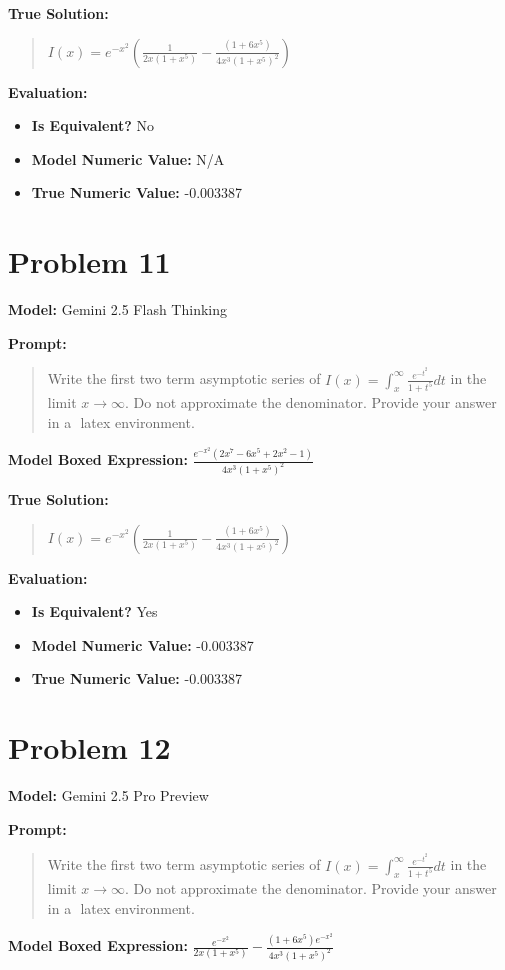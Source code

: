 \documentclass{article}
\begin{document}
\textbf{True Solution:}
\begin{quote}
$I(x) = e^{-x^2}(\frac{1}{2x(1+x^5)} - \frac{(1+6x^5)}{4x^3(1+x^5)^2})$
\end{quote}

\textbf{Evaluation:}
\begin{itemize}
\item \textbf{Is Equivalent?} No
\item \textbf{Model Numeric Value:} N/A
\item \textbf{True Numeric Value:} -0.003387
\end{itemize}
\vspace{1cm}
\section*{Problem 11}
\textbf{Model:} Gemini 2.5 Flash Thinking

\textbf{Prompt:}
\begin{quote}
Write the first two term asymptotic series of $I(x) = \int^\infty_x \frac{e^{-t^2}}{1+t^5} dt$ in the limit $x \rightarrow \infty$. Do not approximate the denominator. Provide your answer in a $\boxed{}$ latex environment.
\end{quote}
\textbf{Model Boxed Expression:} $\frac{e^{-x^2} (2x^7-6x^5+2x^2-1)}{4x^3(1+x^5)^2}$

\textbf{True Solution:}
\begin{quote}
$I(x) = e^{-x^2}(\frac{1}{2x(1+x^5)} - \frac{(1+6x^5)}{4x^3(1+x^5)^2})$
\end{quote}

\textbf{Evaluation:}
\begin{itemize}
\item \textbf{Is Equivalent?} Yes
\item \textbf{Model Numeric Value:} -0.003387
\item \textbf{True Numeric Value:} -0.003387
\end{itemize}
\vspace{1cm}
\section*{Problem 12}
\textbf{Model:} Gemini 2.5 Pro Preview

\textbf{Prompt:}
\begin{quote}
Write the first two term asymptotic series of $I(x) = \int^\infty_x \frac{e^{-t^2}}{1+t^5} dt$ in the limit $x \rightarrow \infty$. Do not approximate the denominator. Provide your answer in a $\boxed{}$ latex environment.
\end{quote}
\textbf{Model Boxed Expression:} $\frac{e^{-x^2}}{2x(1+x^5)} - \frac{(1+6x^5)e^{-x^2}}{4x^3(1+x^5)^2}$
\end{document}
